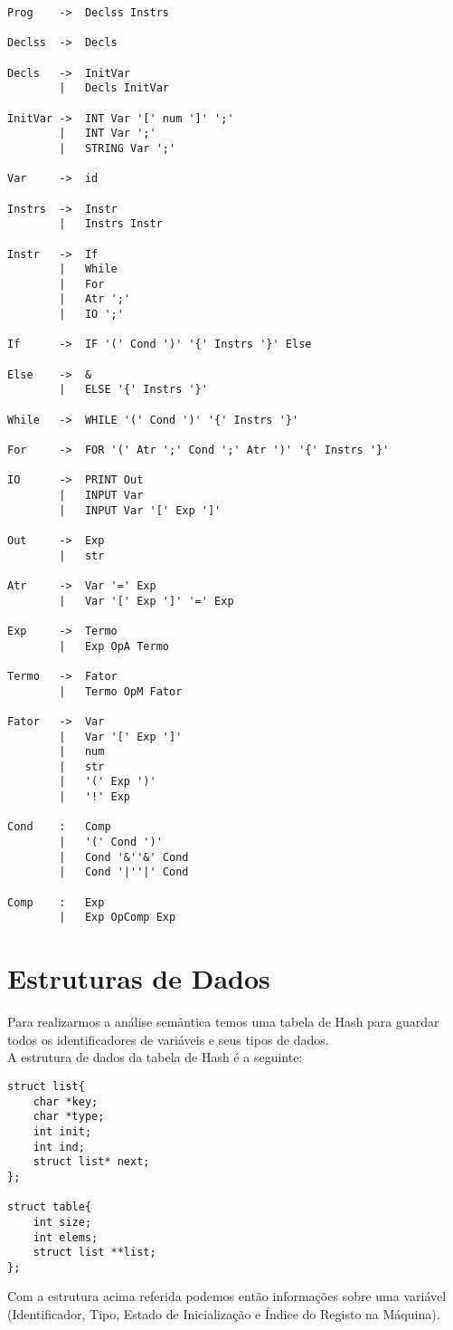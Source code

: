 \documentclass{report}
\begin{document}
\begin{verbatim}
Prog    ->  Declss Instrs

Declss  ->  Decls

Decls   ->  InitVar
        |   Decls InitVar

InitVar ->  INT Var '[' num ']' ';'
        |   INT Var ';'
        |   STRING Var ';'

Var     ->  id

Instrs  ->  Instr
        |   Instrs Instr

Instr   ->  If
        |   While
        |   For
        |   Atr ';'
        |   IO ';'

If      ->  IF '(' Cond ')' '{' Instrs '}' Else

Else    ->  &
        |   ELSE '{' Instrs '}'

While   ->  WHILE '(' Cond ')' '{' Instrs '}'

For     ->  FOR '(' Atr ';' Cond ';' Atr ')' '{' Instrs '}'

IO      ->  PRINT Out
        |   INPUT Var
        |   INPUT Var '[' Exp ']'

Out     ->  Exp
        |   str

Atr     ->  Var '=' Exp
        |   Var '[' Exp ']' '=' Exp

Exp     ->  Termo
        |   Exp OpA Termo

Termo   ->  Fator
        |   Termo OpM Fator

Fator   ->  Var
        |   Var '[' Exp ']'
        |   num
        |   str
        |   '(' Exp ')'
        |   '!' Exp

Cond    :   Comp
        |   '(' Cond ')'
        |   Cond '&''&' Cond
        |   Cond '|''|' Cond

Comp    :   Exp
        |   Exp OpComp Exp
\end{verbatim}

\section{Estruturas de Dados}
Para realizarmos a análise semântica temos uma tabela de Hash para guardar todos os identificadores de variáveis e seus tipos de dados. \\A estrutura de dados da tabela de Hash é a seguinte:\\
\begin{verbatim}
struct list{
    char *key;
    char *type;
    int init;
    int ind;
    struct list* next;
};

struct table{
    int size;
    int elems;
    struct list **list;
};
\end{verbatim}
Com a estrutura acima referida podemos então informações sobre uma variável (Identificador, Tipo, Estado de Inicialização e Índice do Registo na Máquina).
\end{document}
